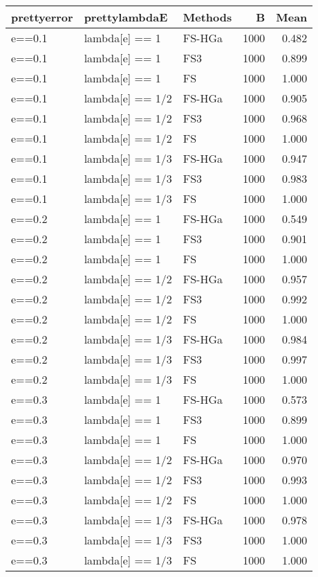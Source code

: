 \begin{table}[ht]
\centering
\begin{tabular}{lllrr}
  \hline
prettyerror & prettylambdaE & Methods & B & Mean \\ 
  \hline
e==0.1 & lambda[e] == 1 & FS-HGa & 1000 & 0.482 \\ 
  e==0.1 & lambda[e] == 1 & FS3 & 1000 & 0.899 \\ 
  e==0.1 & lambda[e] == 1 & FS & 1000 & 1.000 \\ 
  e==0.1 & lambda[e] == 1/2 & FS-HGa & 1000 & 0.905 \\ 
  e==0.1 & lambda[e] == 1/2 & FS3 & 1000 & 0.968 \\ 
  e==0.1 & lambda[e] == 1/2 & FS & 1000 & 1.000 \\ 
  e==0.1 & lambda[e] == 1/3 & FS-HGa & 1000 & 0.947 \\ 
  e==0.1 & lambda[e] == 1/3 & FS3 & 1000 & 0.983 \\ 
  e==0.1 & lambda[e] == 1/3 & FS & 1000 & 1.000 \\ 
  e==0.2 & lambda[e] == 1 & FS-HGa & 1000 & 0.549 \\ 
  e==0.2 & lambda[e] == 1 & FS3 & 1000 & 0.901 \\ 
  e==0.2 & lambda[e] == 1 & FS & 1000 & 1.000 \\ 
  e==0.2 & lambda[e] == 1/2 & FS-HGa & 1000 & 0.957 \\ 
  e==0.2 & lambda[e] == 1/2 & FS3 & 1000 & 0.992 \\ 
  e==0.2 & lambda[e] == 1/2 & FS & 1000 & 1.000 \\ 
  e==0.2 & lambda[e] == 1/3 & FS-HGa & 1000 & 0.984 \\ 
  e==0.2 & lambda[e] == 1/3 & FS3 & 1000 & 0.997 \\ 
  e==0.2 & lambda[e] == 1/3 & FS & 1000 & 1.000 \\ 
  e==0.3 & lambda[e] == 1 & FS-HGa & 1000 & 0.573 \\ 
  e==0.3 & lambda[e] == 1 & FS3 & 1000 & 0.899 \\ 
  e==0.3 & lambda[e] == 1 & FS & 1000 & 1.000 \\ 
  e==0.3 & lambda[e] == 1/2 & FS-HGa & 1000 & 0.970 \\ 
  e==0.3 & lambda[e] == 1/2 & FS3 & 1000 & 0.993 \\ 
  e==0.3 & lambda[e] == 1/2 & FS & 1000 & 1.000 \\ 
  e==0.3 & lambda[e] == 1/3 & FS-HGa & 1000 & 0.978 \\ 
  e==0.3 & lambda[e] == 1/3 & FS3 & 1000 & 1.000 \\ 
  e==0.3 & lambda[e] == 1/3 & FS & 1000 & 1.000 \\ 
   \hline
\end{tabular}
\end{table}
